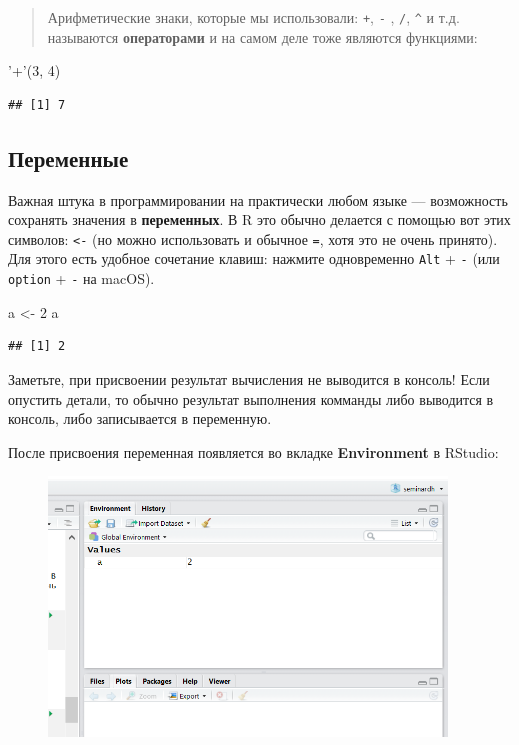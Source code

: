 \documentclass[]{book}
\newenvironment{Shaded}{\begin{snugshade}}{\end{snugshade}}
\newcommand{\DecValTok}[1]{\textcolor[rgb]{0.00,0.00,0.81}{#1}}
\newcommand{\StringTok}[1]{\textcolor[rgb]{0.31,0.60,0.02}{#1}}
\newcommand{\NormalTok}[1]{#1}
\begin{document}
\begin{quote}
Арифметические знаки, которые мы использовали: \texttt{+}, \texttt{-} ,
\texttt{/}, \texttt{\^{}} и т.д. называются \textbf{операторами} и на
самом деле тоже являются функциями:
\end{quote}

\begin{Shaded}
\begin{Highlighting}[]
\StringTok{'+'}\NormalTok{(}\DecValTok{3}\NormalTok{, }\DecValTok{4}\NormalTok{)}
\end{Highlighting}
\end{Shaded}

\begin{verbatim}
## [1] 7
\end{verbatim}

\subsection{Переменные}\label{variables}

Важная штука в программировании на практически любом языке ---
возможность сохранять значения в \textbf{переменных}. В R это обычно
делается с помощью вот этих символов: \texttt{\textless{}-} (но можно
использовать и обычное \texttt{=}, хотя это не очень принято). Для этого
есть удобное сочетание клавиш: нажмите одновременно \texttt{Alt} +
\texttt{-} (или \texttt{option} + \texttt{-} на macOS).

\begin{Shaded}
\begin{Highlighting}[]
\NormalTok{a <-}\StringTok{ }\DecValTok{2}
\NormalTok{a}
\end{Highlighting}
\end{Shaded}

\begin{verbatim}
## [1] 2
\end{verbatim}

Заметьте, при присвоении результат вычисления не выводится в консоль!
Если опустить детали, то обычно результат выполнения комманды либо
выводится в консоль, либо записывается в переменную.

После присвоения переменная появляется во вкладке \textbf{Environment} в
RStudio:

\begin{figure}
\centering
\includegraphics[width=4.16667in]{images/env.png}
\caption{}
\end{figure}
\end{document}
